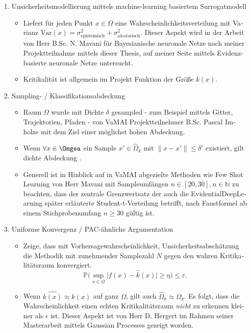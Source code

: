 \begin{otherlanguage}{ngerman}
\begin{enumerate}
  \item Unsicherheitsmodellierung mittels machine-learning basiertem Surrogatmodell
  \begin{itemize}
    \item Liefert für jeden Punkt $x \in \Omega$ eine Wahrscheinlichkeitsverteilung mit Varianz $\mathrm{Var}(x) = \sigma^{2}_{\text{epistemisch}} + \sigma^{2}_{\text{aleatorisch}}$. Dieser Aspekt wird in der Arbeit von Herr B.Sc. N. Mavani für \gls{Bayesianische neuronale Netze} nach meiner Projektteilnahme mittels dieser Thesis, auf meiner Seite mittels \gls{Evidenzbasierte neuronale Netze} untersucht.
    \item Kritikalität ist allgemein im Projekt Funktion der Größe $k(x)$.
  \end{itemize}
  \item Sampling- / Klassifikationsabdeckung
  \begin{itemize}
    \item Raum $\Omega$ wurde mit Dichte $\delta$ gesampled - zum Beispiel mittels Gitter, Trajektorien, Pfaden - von VaMAI Projektteilnehmer B.Sc. Pascal Imholze mit dem Ziel einer möglichst hohen Abdeckung.
    \item Wenn $\forall x \in \Omgea$ ein Sample $x' \in \widehat{\Omega}_k$ mit $\lVert x - x' \rVert \le \delta'$ existiert, gilt \glqq dichte Abdeckung \grqq.
    \item Generell ist in Hinblick auf in VaMAI abgezielte Methoden wie \glqq{}Few Shot Learning\grqq{} von Herr Mavani mit Sampleumfängen $n \in [20, 30], n \in \mathbb{N}$ zu beachten, dass der zentrale Grenzwertsatz der auch die \gls{EvidentialDeepLearning} später erläuterte Student-t-Verteilung betrifft, nach Faustformel ab einem Stichprobenumfang $n \geq 30$ gültig ist. %
  \end{itemize}
  \item Uniforme Konvergenz / PAC-ähnliche Argumentation
  \begin{itemize}
    \item Zeige, dass mit Vorhersagewahrscheinlichkeit, Unsicherheitsabschätzung die Methodik mit zunehmender Samplezahl $N$ gegen den wahren Kritikalitätsraum konvergiert. 
    \[
    \mathbb{P}\bigl( \sup_{x \in \Omega} \bigl\lvert f(x) - \widehat{k}(x) \bigr\rvert \ge \eta \bigr) \le \varepsilon.
    \]
    \item Wenn $\widehat{k(x)} \approx k(x)$ auf ganz $\Omega$, gilt auch $\widehat{\Omega}_{k} \approx \Omega_{k}$. Es folgt, dass die Wahrscheinlichkeit einen echten Kritikalitätsraum \textit{nicht} zu erkennen kleiner als $\epsilon$ ist. Dieser Aspekt ist von Herr D. Hergert im Rahmen seiner Masterarbeit mittels Gaussian Processes gezeigt worden. 
  \end{itemize}


\end{enumerate}
\end{otherlanguage}

